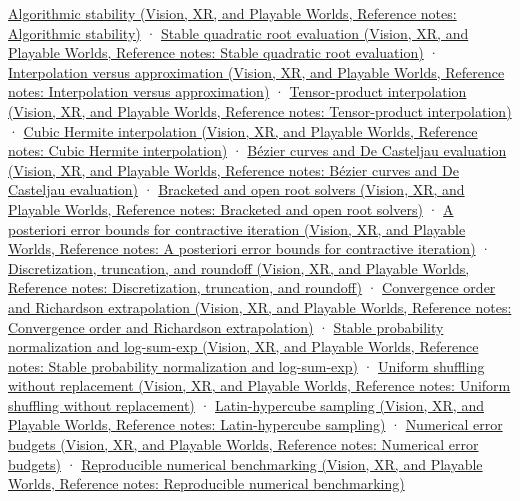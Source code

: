 \href{../07-Vision-XR-and-Playable-Worlds/main.pdf\#nameddest=appendix-aa2bf0d79639}{Algorithmic stability (Vision, XR, and Playable Worlds, Reference notes: Algorithmic stability)} · \href{../07-Vision-XR-and-Playable-Worlds/main.pdf\#nameddest=appendix-b9afba7f63e5}{Stable quadratic root evaluation (Vision, XR, and Playable Worlds, Reference notes: Stable quadratic root evaluation)} · \href{../07-Vision-XR-and-Playable-Worlds/main.pdf\#nameddest=appendix-0c2a5f69851e}{Interpolation versus approximation (Vision, XR, and Playable Worlds, Reference notes: Interpolation versus approximation)} · \href{../07-Vision-XR-and-Playable-Worlds/main.pdf\#nameddest=appendix-0a09b6dfdc86}{Tensor-product interpolation (Vision, XR, and Playable Worlds, Reference notes: Tensor-product interpolation)} · \href{../07-Vision-XR-and-Playable-Worlds/main.pdf\#nameddest=appendix-db3aef8f2fd6}{Cubic Hermite interpolation (Vision, XR, and Playable Worlds, Reference notes: Cubic Hermite interpolation)} · \href{../07-Vision-XR-and-Playable-Worlds/main.pdf\#nameddest=appendix-ddbec701898c}{Bézier curves and De Casteljau evaluation (Vision, XR, and Playable Worlds, Reference notes: Bézier curves and De Casteljau evaluation)} · \href{../07-Vision-XR-and-Playable-Worlds/main.pdf\#nameddest=appendix-f63eb850796d}{Bracketed and open root solvers (Vision, XR, and Playable Worlds, Reference notes: Bracketed and open root solvers)} · \href{../07-Vision-XR-and-Playable-Worlds/main.pdf\#nameddest=appendix-d83b0ad1be7f}{A posteriori error bounds for contractive iteration (Vision, XR, and Playable Worlds, Reference notes: A posteriori error bounds for contractive iteration)} · \href{../07-Vision-XR-and-Playable-Worlds/main.pdf\#nameddest=appendix-6b0648b2b8e8}{Discretization, truncation, and roundoff (Vision, XR, and Playable Worlds, Reference notes: Discretization, truncation, and roundoff)} · \href{../07-Vision-XR-and-Playable-Worlds/main.pdf\#nameddest=appendix-aca80b6bf17a}{Convergence order and Richardson extrapolation (Vision, XR, and Playable Worlds, Reference notes: Convergence order and Richardson extrapolation)} · \href{../07-Vision-XR-and-Playable-Worlds/main.pdf\#nameddest=appendix-d580b422240f}{Stable probability normalization and log-sum-exp (Vision, XR, and Playable Worlds, Reference notes: Stable probability normalization and log-sum-exp)} · \href{../07-Vision-XR-and-Playable-Worlds/main.pdf\#nameddest=appendix-184fcc411663}{Uniform shuffling without replacement (Vision, XR, and Playable Worlds, Reference notes: Uniform shuffling without replacement)} · \href{../07-Vision-XR-and-Playable-Worlds/main.pdf\#nameddest=appendix-1c5e85693a06}{Latin-hypercube sampling (Vision, XR, and Playable Worlds, Reference notes: Latin-hypercube sampling)} · \href{../07-Vision-XR-and-Playable-Worlds/main.pdf\#nameddest=appendix-31b8c295e05f}{Numerical error budgets (Vision, XR, and Playable Worlds, Reference notes: Numerical error budgets)} · \href{../07-Vision-XR-and-Playable-Worlds/main.pdf\#nameddest=appendix-b9db93e28371}{Reproducible numerical benchmarking (Vision, XR, and Playable Worlds, Reference notes: Reproducible numerical benchmarking)}


